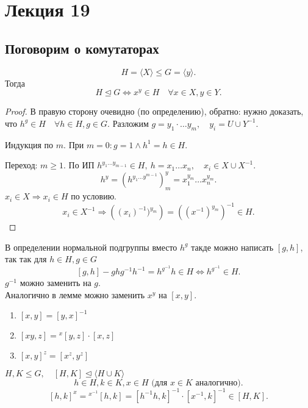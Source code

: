 \documentclass[12pt]{report}
\begin{document}
\section{Лекция 19}
\subsection{Поговорим о комутаторах}
\begin{lm}
    \[
	H = \langle X \rangle \le  G = \langle y \rangle
    .\] 
    Тогда \[
    H \trianglelefteq G \Longleftrightarrow x ^y \in H \quad \forall x \in  X, y \in  Y
    .\] 
\end{lm}
\begin{proof}
    В правую сторону очевидно (по определению), обратно: нужно доказать, что $h^g \in  H \quad \forall h \in  H, g \in G$. Разложим $g = y_1 \cdot \ldots y_m, \quad y_i = U \cup Y^{-1}$. 

    Индукция по $m$. При $m = 0: g=1 \wedge h^1 = h \in  H$.

    Переход: $m \ge 1$. По ИП $h^{y_1 \ldots y_{m-1}} \in  H, ~ h = x_1 \ldots x_n, \quad x_i \in  X \cup X^{-1}$.
	\[
	    h^y = (h^{y_1 \ldots y^{m-1}})^y_m = x_1^{y_m} \ldots x_n^{y_m}	
	.\] 
	$x_i \in X \Rightarrow  x_i \in  H$ по условию.
	\[
	x_i \in  X^{-1} \Rightarrow \left ((x_i)^{-1} )^{y_m} \right ) = \left ( (x^{-1})^{y_m} \right ) ^{-1} \in  H
	.\] 
\end{proof}
\begin{note}
    В определении нормальной подгруппы вместо $h^g$ такде можно написать $[g, h]$, так так для $h \in H, g \in  G$
     \[
	 [g, h] - ghg^{-1}h^{-1} = h^{g^{-1}} h \in  H \Longleftrightarrow h^{g^{-1}} \in  H 
    .\] 
    $g^{-1} $ можно заменить на $g$.\\
    Аналогично в лемме можно заменить $x^y$ на $[x, y]$. 
\end{note}

\begin{prop}
    \begin{enumerate}
	\item $[x, y] = [y, x]^{-1}$
	\item $[xy, z] = \!^x[y, z] \cdot [x, z]$
	\item  $[x, y]^z = [x^z, y^z]$
    \end{enumerate}
\end{prop}
\begin{lm}
    $H, K \le G, \quad [H, K] \trianglelefteq \langle H \cup K \rangle$\\
    \[
	h \in  H, k \in  K, x \in  H \mbox{ (для $x \in  K$ аналогично)} 
    .\] 
    \[
	[h, k]^x = \!^{x^{-1}}[h, k] = [h^{-1} h, k]^{-1}\cdot [x^{-1}, k]^{-1} \in  [H, K]
    .\] 
\end{lm}
\end{document}

